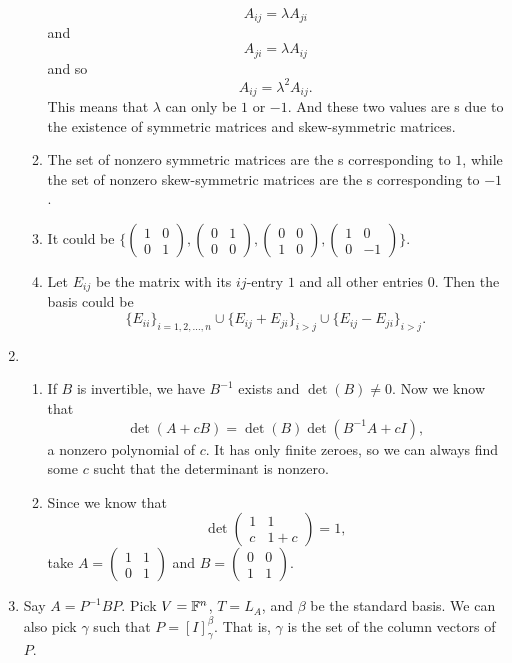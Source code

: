 \begin{enumerate}
\begin{enumerate}
\[A_{ij}=\lambda A_{ji}\]
and 
\[A_{ji}=\lambda A_{ij}\]
and so 
\[A_{ij}=\lambda^2 A_{ij}.\]
This means that $\lambda $ can only be $1$ or $-1$. And these two values are \egva s due to the existence of symmetric matrices and skew-symmetric matrices.
\item The set of nonzero symmetric matrices are the \egve s corresponding to \egva{} $1$, while the set of nonzero skew-symmetric matrices are the \egve s corresponding to \egva{} $-1$.
\item It could be $\{\begin{pmatrix}1&0\\0&1\end{pmatrix},\begin{pmatrix}0&1\\0&0\end{pmatrix},\begin{pmatrix}0&0\\1&0\end{pmatrix},\begin{pmatrix}1&0\\0&-1\end{pmatrix}\}$.
\item Let $E_{ij}$ be the matrix with its $ij$-entry $1$ and all other entries $0$. Then the basis could be 
\[\{E_{ii}\}_{i=1,2,\ldots ,n}\cup \{E_{ij}+E_{ji}\}_{i>j}\cup \{E_{ij}-E_{ji}\}_{i>j}.\]
\end{enumerate}
\item \begin{enumerate}
\item If $B$ is invertible, we have $B^{-1}$ exists and $\det(B)\neq 0$. Now we know that 
\[\det(A+cB)=\det(B)\det(B^{-1}A+cI),\]
a nonzero polynomial of $c$. It has only finite zeroes, so we can always find some $c$ sucht that the determinant is nonzero.
\item Since we know that 
\[\det\begin{pmatrix}1&1\\c&1+c\end{pmatrix}=1,\]
take $A=\begin{pmatrix}1&1\\0&1\end{pmatrix}$ and $B=\begin{pmatrix}0&0\\1&1\end{pmatrix}$.
\end{enumerate}
\item Say $A=P^{-1}BP$. Pick $V=\mathbb{F}^n$, $T=L_A$, and $\beta $ be the standard basis. We can also pick $\gamma $ such that $P=[I]_{\gamma}^{\beta}$. That is, $\gamma $ is the set of the column vectors of $P$.

\end{enumerate}
